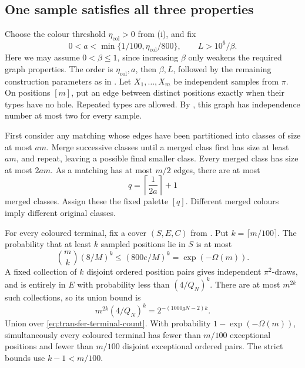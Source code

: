 \subsection{One sample satisfies all three properties}

Choose the colour threshold \(\eta_{\mathrm{col}}>0\) from
(i), and fix
\begin{equation}\label{eq:transfer-a-L}
 0<a<\min\{1/100,\eta_{\mathrm{col}}/800\},\qquad
 L>10^6/\beta.
\end{equation}
Here we may assume \(0<\beta\le1\), since increasing \(\beta\)
only weakens the required graph properties.  The order is
\(\eta_{\mathrm{col}},a\), then \(\beta,L\), followed by the
remaining construction parameters as in .
Let \(X_1,\ldots,X_m\) be independent samples from \(\pi\).
On positions \([m]\), put an edge between distinct positions
exactly when their types have no hole.  Repeated types are allowed.
By , this graph has independence
number at most two for every sample.

First consider any matching whose edges have been partitioned
into classes of size at most \(am\).  Merge successive classes
until a merged class first has size at least \(am\), and repeat,
leaving a possible final smaller class.  Every merged class has
size at most \(2am\).  As a matching has at most \(m/2\) edges,
there are at most
\[
 q=\left\lceil\frac1{2a}\right\rceil+1
\]
merged classes.  Assign these the fixed palette \([q]\).
Different merged colours imply different original classes.

For every coloured terminal, fix a cover \((S,E,C)\) from
.  Put \(k=\lceil m/100\rceil\).
The probability that at least \(k\) sampled positions lie in
\(S\) is at most
\[
 \binom mk(8/M)^k\le(800e/M)^k=\exp(-\Omega(m)).
\]
A fixed collection of \(k\) disjoint ordered position pairs
gives independent \(\pi^2\)-draws, and is entirely in \(E\)
with probability less than \((4/Q_N)^k\).  There are at most
\(m^{2k}\) such collections, so its union bound is
\begin{equation}\label{eq:transfer-pair-tail}
 m^{2k}(4/Q_N)^k=2^{-(1000gN-2)k}.
\end{equation}
Union over \eqref{eq:transfer-terminal-count}.  With probability
\(1-\exp(-\Omega(m))\), simultaneously every coloured terminal
has fewer than \(m/100\) exceptional positions and fewer than
\(m/100\) disjoint exceptional ordered pairs.  The strict bounds
use \(k-1<m/100\).

